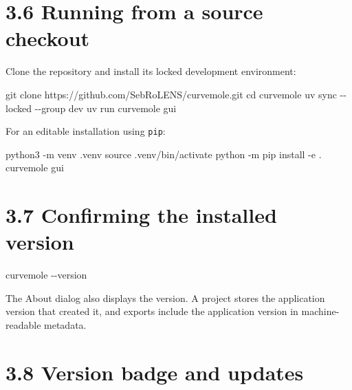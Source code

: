 \documentclass[
  10pt,
  a4paper,
  oneside]{scrreprt}
\newenvironment{Shaded}{}{}
\newcommand{\BuiltInTok}[1]{#1}
\newcommand{\ExtensionTok}[1]{#1}
\newcommand{\FunctionTok}[1]{\textcolor[rgb]{0.02,0.16,0.49}{#1}}
\newcommand{\NormalTok}[1]{#1}
\begin{document}
\hypertarget{running-from-a-source-checkout}{%
\section{3.6 Running from a source
checkout}\label{running-from-a-source-checkout}}

Clone the repository and install its locked development environment:

\begin{Shaded}
\begin{Highlighting}[]
\FunctionTok{git}\NormalTok{ clone https://github.com/SebRoLENS/curvemole.git}
\BuiltInTok{cd}\NormalTok{ curvemole}
\ExtensionTok{uv}\NormalTok{ sync {-}{-}locked {-}{-}group dev}
\ExtensionTok{uv}\NormalTok{ run curvemole gui}
\end{Highlighting}
\end{Shaded}

For an editable installation using \texttt{pip}:

\begin{Shaded}
\begin{Highlighting}[]
\ExtensionTok{python3}\NormalTok{ {-}m venv .venv}
\BuiltInTok{source}\NormalTok{ .venv/bin/activate}
\ExtensionTok{python}\NormalTok{ {-}m pip install {-}e .}
\ExtensionTok{curvemole}\NormalTok{ gui}
\end{Highlighting}
\end{Shaded}

\hypertarget{confirming-the-installed-version}{%
\section{3.7 Confirming the installed
version}\label{confirming-the-installed-version}}

\begin{Shaded}
\begin{Highlighting}[]
\ExtensionTok{curvemole}\NormalTok{ {-}{-}version}
\end{Highlighting}
\end{Shaded}

The About dialog also displays the version. A project stores the
application version that created it, and exports include the application
version in machine-readable metadata.

\hypertarget{version-badge-and-updates}{%
\section{3.8 Version badge and
updates}\label{version-badge-and-updates}}
\end{document}
